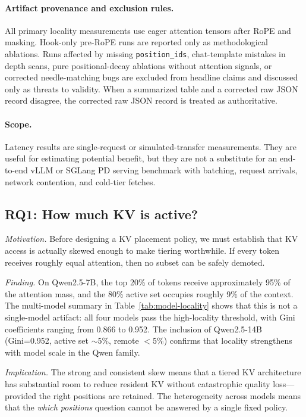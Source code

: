 \documentclass[11pt]{article}
\newcommand{\pct}{\%}
\theoremstyle{definition}
\theoremstyle{plain}
\begin{document}
\paragraph{Artifact provenance and exclusion rules.}
All primary locality measurements use eager attention tensors after RoPE and masking.  Hook-only pre-RoPE runs are reported only as methodological ablations.  Runs affected by missing \texttt{position\_ids}, chat-template mistakes in depth scans, pure positional-decay ablations without attention signals, or corrected needle-matching bugs are excluded from headline claims and discussed only as threats to validity.  When a summarized table and a corrected raw JSON record disagree, the corrected raw JSON record is treated as authoritative.

\paragraph{Scope.}
Latency results are single-request or simulated-transfer measurements.  They are useful for estimating potential benefit, but they are not a substitute for an end-to-end vLLM or SGLang PD serving benchmark with batching, request arrivals, network contention, and cold-tier fetches.

\subsection{RQ1: How much KV is active?}
\label{sec:rq1}

\emph{Motivation.}  Before designing a KV placement policy, we must establish that KV access is actually skewed enough to make tiering worthwhile.  If every token receives roughly equal attention, then no subset can be safely demoted.

\emph{Finding.}  On Qwen2.5-7B, the top 20\pct{} of tokens receive approximately 95\pct{} of the attention mass, and the 80\pct{} active set occupies roughly 9\pct{} of the context.  The multi-model summary in Table~\ref{tab:model-locality} shows that this is not a single-model artifact: all four models pass the high-locality threshold, with Gini coefficients ranging from 0.866 to 0.952.  The inclusion of Qwen2.5-14B (Gini=0.952, active set $\sim$5\pct{}, remote $<$5\pct{}) confirms that locality strengthens with model scale in the Qwen family.

\emph{Implication.}  The strong and consistent skew means that a tiered KV architecture has substantial room to reduce resident KV without catastrophic quality loss---provided the right positions are retained.  The heterogeneity across models means that the \emph{which positions} question cannot be answered by a single fixed policy.
\end{document}

